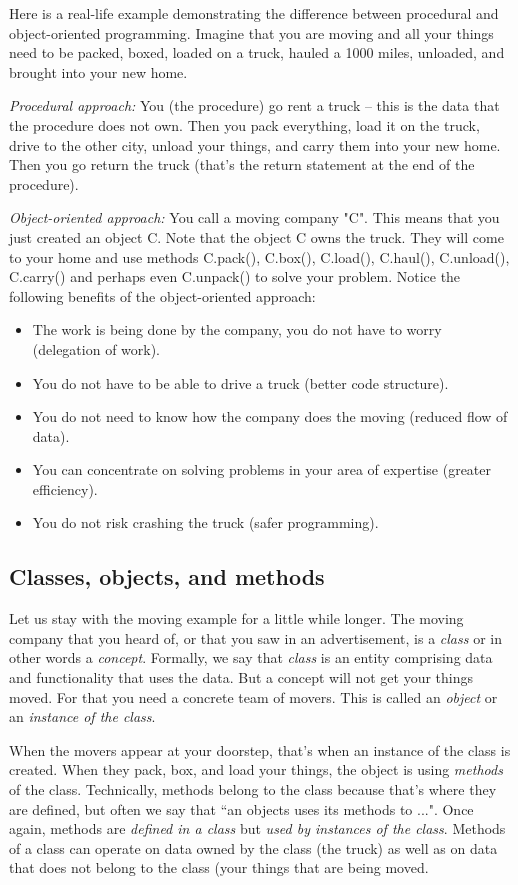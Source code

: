 \documentclass[article,A4,12pt]{llncs}
\begin{document}
Here is a real-life example demonstrating the difference between 
procedural and object-oriented programming. Imagine that you are moving 
and all your things need to be packed, boxed, loaded on a truck, hauled 
a 1000 miles, unloaded, and brought into your new home. 

{\em Procedural approach:} You (the procedure) 
go rent a truck -- this is the data that the procedure does not own. Then
you pack everything, load it on the truck, drive to the other city, 
unload your things, and carry them into your new home. Then you go 
return the truck (that's the return statement at the end of the procedure).

{\em Object-oriented approach:} You call a moving company "C". This means 
that you just created an object C. Note that the 
object C owns the truck. They will come to your home and use methods 
C.pack(), C.box(), C.load(), C.haul(), C.unload(), C.carry() and perhaps 
even C.unpack() to solve your problem. Notice the following benefits of the object-oriented approach: 
\begin{itemize}
\item The work is being done by the company, 
      you do not have to worry (delegation of work).
\item You do not have to be able to drive a truck (better code structure). 
\item You do not need to know how the company does the moving (reduced flow of data).
\item You can concentrate on solving problems 
      in your area of expertise (greater efficiency).
\item You do not risk crashing the truck (safer programming).
\end{itemize}

\subsection{Classes, objects, and methods}

Let us stay with the moving example for a little while longer. The moving 
company that you heard of, or that you saw in an advertisement, 
is a {\em class} or in other words a {\em concept}. Formally, we say that 
{\em class} is an entity comprising data and functionality that uses the data.
But a concept will not get your things moved. For that you need a concrete team of 
movers. This is called an {\em object} or an {\em instance of the class}. 

When the movers appear at your doorstep, that's when an instance 
of the class is created. When they pack, box, and load your things, the object is using 
{\em methods} of the class. Technically, methods belong to the class because that's
where they are defined, but often we say that ``an objects uses its methods to ...". 
Once again, methods are {\em defined in a class} but {\em used 
by instances of the class}. 
Methods of a class can operate on data owned by the class (the truck) as well as 
on data that does not belong to the class (your things that are being moved.
\end{document}
